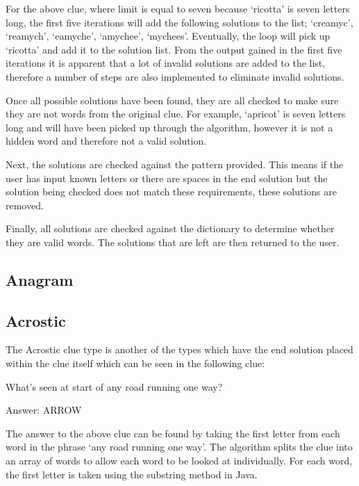 For the above clue, where limit is equal to seven because `ricotta' is seven letters 
long, the first five iterations will add the following solutions to the list; `creamyc', 
`reamych', `eamyche', `amychee', `mychees'. Eventually, the loop will pick up 
`ricotta' and add it to the solution list. From the output gained in the first five 
iterations it is apparent that a lot of invalid solutions are added to the list, therefore
a number of steps are also implemented to eliminate invalid solutions.

Once all possible solutions have been found, they are all checked to make sure they are
not words from the original clue. For example, `apricot' is seven letters long and will 
have been picked up through the algorithm, however it is not a hidden word and therefore 
not a valid solution. 

Next, the solutions are checked against the pattern provided. This means if the user 
has input known letters or there are spaces in the end solution but the solution being 
checked does not match these requirements, these solutions are removed. 

Finally, all solutions are checked against the dictionary to determine whether they 
are valid words. The solutions that are left are then returned to the user.   

\subsection{Anagram}

\subsection{Acrostic}

The Acrostic clue type is another of the types which have the end solution placed within 
the clue itself which can be seen in the following clue:

What’s seen at start of any road running one way?

Answer: ARROW

The answer to the above clue can be found by taking the first letter from each word in 
the phrase `any road running one way'. The algorithm splits the clue into an array of words 
to allow each word to be looked at individually. For each word, the first letter is taken 
using the substring method in Java. 

